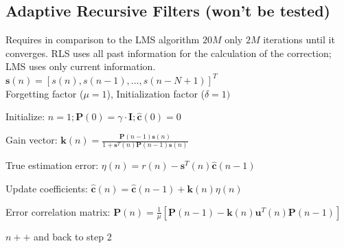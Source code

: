 \subsection{Adaptive Recursive Filters (won't be tested) }
\begin{minipage}{8.4cm}
    Requires in comparison to the LMS algorithm $20M$ only $2M$ iterations until it converges. RLS uses all past
    information for the calculation of the correction; LMS uses only current information. \\
    $\mathbf{s}(n) = [s(n), s(n-1), \ldots, s(n - N + 1)]^T$ \\
    Forgetting factor ($\mu=1$),
    Initialization factor ($\delta = 1)$
\end{minipage}
\begin{minipage}{11cm}
    \begin{aufzaehlung}
        \item Initialize: $n=1; \mathbf{P}(0)=\gamma \cdot \mathbf{I}; \mathbf{\hat{c}}(0)=0$
        \item Gain vector: $ \mathbf{k}(n) = \frac{\mathbf{P}(n-1)\mathbf{s}(n)}{1 + \mathbf{s}^T(n) \mathbf{P}(n-1) \mathbf{s}(n)}$
        \item True estimation error: $\eta(n) = r(n) - \mathbf{s}^T(n) \mathbf{\hat{c}}(n-1)$
        \item Update coefficients: $\mathbf{\hat{c}}(n) = \mathbf{\hat{c}}(n-1) + \mathbf{k}(n) \eta(n)$
        \item Error correlation matrix: \small $\mathbf P(n) = \frac1\mu [ \mathbf P (n-1) - \mathbf k (n) \mathbf u^T (n) \mathbf P(n-1)]$
\normalsize        \item $n++$ and back to step 2
    \end{aufzaehlung}
\end{minipage}
